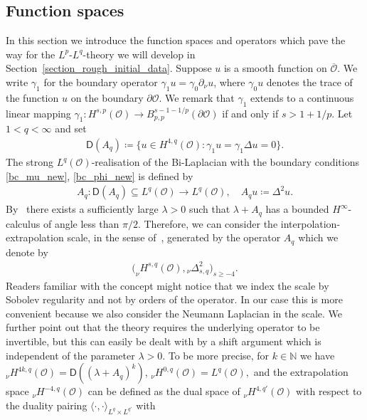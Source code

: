 \documentclass[reqno]{amsart}
\newcommand{\N}{\mathbb{N}}
\newcommand{\sO}{\mathscr{O}}
\newcommand{\ce}{\coloneqq}
\newcommand{\seq}{\subseteq}
\newcommand{\1}{\mathbf{1}}
\begin{document}
\subsection{Function spaces}\label{subsec:function_spaces}
In this section we introduce the function spaces and operators which pave the way for the $L^p$-$L^q$-theory we will develop in Section~\ref{section_rough_initial_data}. Suppose $u$ is a smooth function on $\overline{\sO}$. We write $\gamma_1$ for the boundary operator $\gamma_1 u=\gamma_0 \partial_\nu u$, where $\gamma_0 u$ denotes the trace of the function $u$ on the boundary $\partial \sO$.
We remark that $\gamma_1$ extends to a continuous linear mapping $ \gamma_1\colon H^{s,p}(\sO)\to B_{p,p}^{s-1-1/p}(\partial\sO)$ if and only if $s>1+1/p$.
Let $1<q<\infty$ and set 
\begin{align*}
     \mathsf{D}(A_q)\ce \{ u \in H^{4,q}(\sO)\colon \gamma_1 u = \gamma_1 \Delta u=0\}.
\end{align*}
The strong $L^q(\sO)$-realisation of the Bi-Laplacian with the boundary conditions \eqref{bc_mu_new}, \eqref{bc_phi_new} is defined by 
\begin{align*}
     A_q \colon \mathsf{D}( A_q) \seq L^q(\sO)\to L^q(\sO), \quad A_q u\ce \Delta^2 u.
\end{align*}
By~\cite[Theorem~2.3]{denkNewThoughtsOld2004} there exists a sufficiently large $\lambda>0$ such that $ \lambda+ A_q$ has a bounded $H^\infty$-calculus of angle less than $\pi/2$. Therefore, we can consider the interpolation-extrapolation scale, in the sense of~\cite[Chapter~V]{amannLinearQuasilinearParabolic1995}, generated by the operator $A_q$ which we denote by
\begin{align*}
    \big( _\nu H^{s, q}(\sO), {_\nu\Delta_{s,q}^2} \big)_{s \ge -4}.
\end{align*}
Readers familiar with the concept might notice that we index the scale by Sobolev regularity and not by orders of the operator. In our case this is more convenient because we also consider the Neumann Laplacian in the scale.
We further point out that the theory requires the underlying operator to be invertible, but this can easily be dealt with by a shift argument which is independent of the parameter $\lambda>0$. To be more precise, for $k\in \N$ we have $_\nu H^{4k, q}(\sO)=\mathsf{D}((\lambda + A_q)^k)$, $_\nu H^{0, q}(\sO)=L^q(\sO),$ and the extrapolation space $_\nu H^{-4, q}(\sO)$ can be defined as the dual space of $_\nu H^{4, q'}(\sO)$ with respect to the duality pairing $\langle \cdot,\cdot \rangle_{L^q\times L^{q'}}$ with
\end{document}
